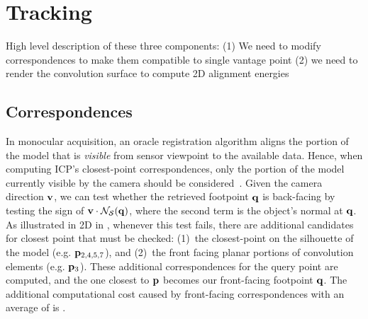 \section{Tracking}
\begin{DRAFT}
High level description of these three components:
(1) We need to modify correspondences to make them compatible to single vantage point
(2) we need to render the convolution surface to compute 2D alignment energies
\end{DRAFT}


\subsection{Correspondences}
In monocular acquisition, an oracle registration algorithm aligns the portion of the model that is \emph{visible} from sensor viewpoint to the available data. Hence, when computing ICP's closest-point correspondences, only the portion of the model currently visible by the camera should be considered~\cite{tagliasacchi2015robust}. Given the camera direction $\mathbf{v}$, we can test whether the retrieved footpoint $\mathbf{q}$ is back-facing by testing the sign of $\mathbf{v} \cdot \mathcal{N}_{\mathcal{S}}(\mathbf{q})$, where the second term is the object's normal at $\mathbf{q}$. As illustrated in 2D in , whenever this test fails, there are additional candidates for closest point that must be checked: (1)~the closest-point on the silhouette of the model (e.g. $\mathbf{p}_{2,4,5,7}$), and (2)~the front facing planar portions of convolution elements (e.g. $\mathbf{p}_{3}$). These additional correspondences for the query point are computed, and the one closest to $\mathbf{p}$ becomes our front-facing footpoint $\mathbf{q}$. The additional computational cost caused by front-facing correspondences with an average of  is .



